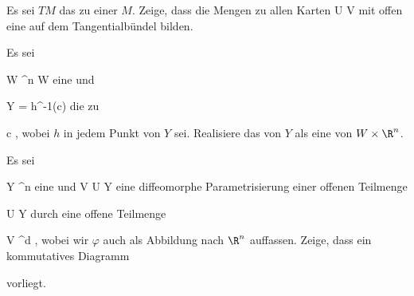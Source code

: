 {}
{

Es sei $TM$ das
zu einer
$M$. Zeige, dass die Mengen
 zu allen Karten
\maabbdisp {\alpha} { U } { V
} {}
mit
 offen eine
auf dem Tangentialbündel bilden.

}
{} {}

{}
{

Es sei

\mavergleichskette
{\vergleichskette
{ W
}
{ \subseteq }{ \R^n
}
{  }{
}
{    }{
}
{   }{
}
}
{}{}{}
 { W } { \R
} {}
eine
und

\mavergleichskette
{\vergleichskette
{ Y
}
{ = }{ h^{-1}(c)
}
{  }{
}
{    }{
}
{   }{
}
}
{}{}{}
die
zu

\mavergleichskette
{\vergleichskette
{ c
}
{ \in }{ \R
}
{  }{
}
{    }{
}
{   }{
}
}
{}{}{,}
wobei $h$ in jedem Punkt von $Y$
sei. Realisiere das
von $Y$ als eine
von $W \times \R^n$.

}
{} {}

{}
{

Es sei

\mavergleichskette
{\vergleichskette
{ Y
}
{ \subseteq }{ \R^n
}
{  }{
}
{    }{
}
{   }{
}
}
{}{}{}
eine
und
\maabb {\varphi} { V } { U \subseteq Y
} {}
eine diffeomorphe Parametrisierung einer offenen Teilmenge

\mavergleichskette
{\vergleichskette
{ U
}
{ \subseteq }{ Y
}
{  }{
}
{    }{
}
{   }{
}
}
{}{}{}
durch eine offene Teilmenge

\mavergleichskette
{\vergleichskette
{ V
}
{ \subseteq }{ \R^d
}
{  }{
}
{    }{
}
{   }{
}
}
{}{}{,}
wobei wir $\varphi$ auch als Abbildung nach $\R^n$ auffassen. Zeige, dass ein kommutatives Diagramm

 {  }

vorliegt.

}
{} {}

